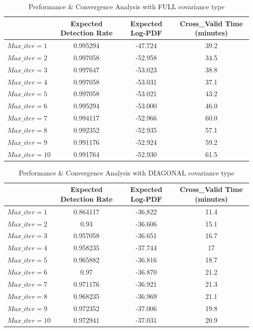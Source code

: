 \documentclass[12pt,DIV14,BCOR12mm,a4paper,footinclude=false,headinclude,parskip=half-,twoside,openright,cleardoublepage=empty,toc=index,bibliography=totoc,listof=totoc]{scrreprt}
\numberwithin{equation}{chapter}
\begin{document}
\begin{table}
	\centering
	\caption{Performance \& Convergence Analysis with FULL covariance type}
	\label{fullcov}
	\begin{tabular}{lccc}
		\toprule
& Expected Detection Rate & Expected Log-PDF & Cross\_Valid Time (minutes) \\
\midrule
$Max\_iter=1$ & 0.995294 & -47.724 &  39.2 \\
$Max\_iter=2$ & 0.997058 & -52.958 &  34.5 \\
$Max\_iter=3$ & 0.997647 & -53.023 &  38.8 \\
$Max\_iter=4$ & 0.997058 & -53.031 &  37.1 \\
$Max\_iter=5$ & 0.997058 & -53.021 &  43.2 \\
$Max\_iter=6$ & 0.995294 & -53.000 &  46.0 \\
$Max\_iter=7$ & 0.994117 & -52.966 &  60.0 \\
$Max\_iter=8$ & 0.992352 & -52.935 &  57.1 \\
$Max\_iter=9$ & 0.991176 & -52.924 &  59.2 \\
$Max\_iter=10$ & 0.991764 & -52.930 &  61.5 \\
\bottomrule
	\end{tabular}
\end{table}

\begin{table}
	\centering
	\caption{Performance \& Convergence Analysis with DIAGONAL covariance type}
	\label{diagcov}
	\begin{tabular}{lccc}
		\toprule
		& Expected Detection Rate & Expected Log-PDF & Cross\_Valid Time (minutes) \\
		\midrule
		$Max\_iter=1$ & 0.864117 & -36,822 &  11.4 \\
		$Max\_iter=2$ & 0.93 & -36.606 &  15.1 \\
		$Max\_iter=3$ & 0.957058 & -36.651 &  16.7 \\
		$Max\_iter=4$ & 0.958235 & -37.744 &  17 \\
		$Max\_iter=5$ & 0.965882 & -36.816 &  18.7 \\
		$Max\_iter=6$ & 0.97 & -36.870 &  21.2 \\
		$Max\_iter=7$ & 0.971176 & -36.921 &  21.3 \\
		$Max\_iter=8$ & 0.968235 & -36.969 &  21.1 \\
		$Max\_iter=9$ & 0.972352 & -37.006 &  19.8 \\
		$Max\_iter=10$ & 0.972941 & -37.031 &  20.9 \\
		\bottomrule
	\end{tabular}
\end{table}
\end{document}
